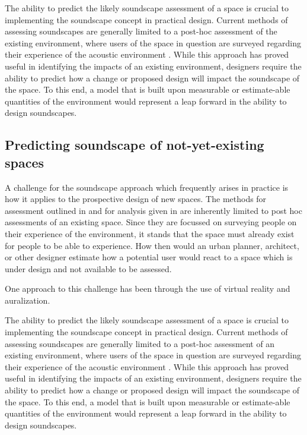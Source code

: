 The ability to predict the likely soundscape assessment of a space is crucial to implementing the soundscape concept in practical design. Current methods of assessing soundscapes are generally limited to a post-hoc assessment of the existing environment, where users of the space in question are surveyed regarding their experience of the acoustic environment \citep{Engel2018Review, Zhang2018Effect}. While this approach has proved useful in identifying the impacts of an existing environment, designers require the ability to predict how a change or proposed design will impact the soundscape of the space. To this end, a model that is built upon measurable or estimate-able quantities of the environment would represent a leap forward in the ability to design soundscapes.

\subsection{Predicting soundscape of not-yet-existing spaces}

A challenge for the soundscape approach which frequently arises in practice is how it applies to the prospective design of new spaces. The methods for assessment outlined in \citet{ISO12913Part2} and for analysis given in \citet{ISO12913Part3} are inherently limited to post hoc assessments of an existing space. Since they are focussed on surveying people on their experience of the environment, it stands that the space must already exist for people to be able to experience. How then would an urban planner, architect, or other designer estimate how a potential user would react to a space which is under design and not available to be assessed.

One approach to this challenge has been through the use of virtual reality and auralization.


The ability to predict the likely soundscape assessment of a space is crucial to implementing the soundscape concept in practical design. Current methods of assessing soundscapes are generally limited to a post-hoc assessment of an existing environment, where users of the space in question are surveyed regarding their experience of the acoustic environment \citep{Engel2018Review, Zhang2018Effect}. While this approach has proved useful in identifying the impacts of an existing environment, designers require the ability to predict how a change or proposed design will impact the soundscape of the space. To this end, a model that is built upon measurable or estimate-able quantities of the environment would represent a leap forward in the ability to design soundscapes.

